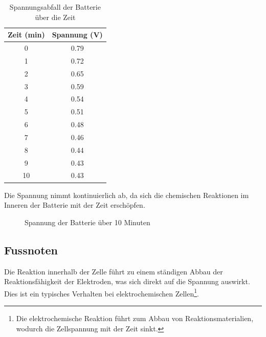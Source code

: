 \documentclass[ngerman, a4paper,12pt]{article}
\begin{document}
\begin{table}[ht!]
\centering
\begin{tabular}{|c|c|}
\hline
\textbf{Zeit (min)} & \textbf{Spannung (V)} \\
\hline
0 & 0.79 \\
1 & 0.72 \\
2 & 0.65 \\
3 & 0.59 \\
4 & 0.54 \\
5 & 0.51 \\
6 & 0.48 \\
7 & 0.46 \\
8 & 0.44 \\
9 & 0.43 \\
10 & 0.43 \\
\hline
\end{tabular}
\caption{Spannungsabfall der Batterie über die Zeit}
\end{table}

\noindent Die Spannung nimmt kontinuierlich ab, da sich die chemischen Reaktionen im Inneren der Batterie mit der Zeit erschöpfen.\cite{author4}

\begin{figure}[ht!]
\centering
{}
\caption{Spannung der Batterie über 10 Minuten}
\end{figure}

\subsection{Fussnoten}
Die Reaktion innerhalb der Zelle führt zu einem ständigen Abbau der Reaktionsfähigkeit der Elektroden, was sich direkt auf die Spannung auswirkt. Dies ist ein typisches Verhalten bei elektrochemischen Zellen\footnote{Die elektrochemische Reaktion führt zum Abbau von Reaktionsmaterialien, wodurch die Zellspannung mit der Zeit sinkt.\cite{author2}}.

\newpage
\end{document}
